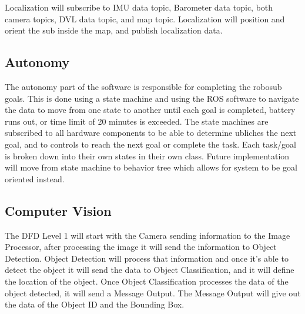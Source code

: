Localization will subscribe to IMU data topic, Barometer data topic, both
camera topics, DVL data topic, and map topic. Localization will position and
orient the sub inside the map, and publish localization data.
\par

\subsection{Autonomy}
\label{sec:autonomy}

The autonomy part of the software is responsible for completing the robosub
goals. This is done using a state machine and using the ROS software to
navigate the data to move from one state to another until each goal is
completed, battery runs out, or time limit of 20 minutes is exceeded. The state
machines are subscribed to all hardware components to be able to determine
ubliches the next goal, and to controls to reach the next goal or complete the
task. Each task/goal is broken down into their own states in their own class.
Future implementation will move from state machine to behavior tree which
allows for system to be goal oriented instead.
\par

\subsection{Computer Vision}
\label{sec:computer_vision}

The DFD Level 1 will start with the Camera sending information to the Image
Processor, after processing the image it will send the information to Object
Detection. Object Detection will process that information and once it’s able to
detect the object it will send the data to Object Classification, and it will
define the location of the object. Once Object Classification processes the
data of the object detected, it will send a Message Output. The Message Output
will give out the data of the Object ID and the Bounding Box.
\par

